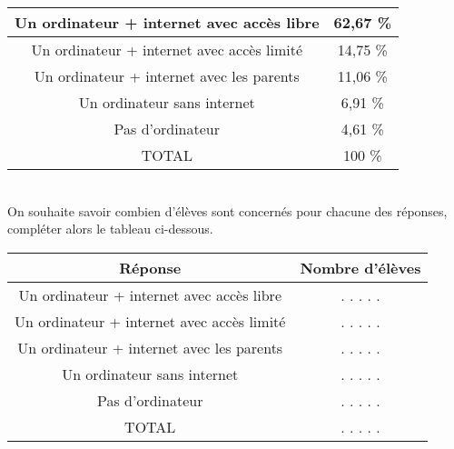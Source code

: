 \documentclass[a4paper,11pt]{article}
\begin{document}
\begin{tabular}{|c|c|}
\hline 
Un ordinateur + internet avec accès libre  & 62,67 \% \\ 
\hline 
Un ordinateur + internet avec accès limité  & 14,75 \% \\  
\hline 
Un ordinateur + internet avec les parents  & 11,06 \% \\   
\hline 
Un ordinateur sans  internet  & 6,91 \% \\ 
\hline 
Pas d'ordinateur & 4,61 \% \\ 
\hline 
TOTAL & 100 \% \\ 
\hline 
\end{tabular} \\


On souhaite savoir combien d'élèves sont concernés pour chacune des réponses, compléter alors le tableau ci-dessous.\\


\begin{tabular}{|c|c|}
\hline 
Réponse  & Nombre d'élèves \\ 
\hline 
Un ordinateur + internet avec accès libre  & . . . . . \\ 
\hline 
Un ordinateur + internet avec accès limité  & . . . . . \\ 
\hline 
Un ordinateur + internet avec les parents  & . . . . . \\ 
\hline 
Un ordinateur sans  internet  & . . . . . \\ 
\hline 
Pas d'ordinateur & . . . . . \\ 
\hline 
TOTAL & . . . . . \\ 
\hline 
\end{tabular} 
\end{document}
